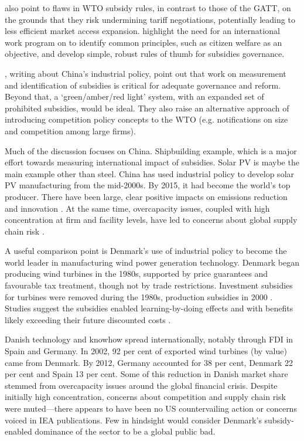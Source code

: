 \documentclass{article}
\begin{document}
\textcite{bagwell_will_2006} also point to flaws in WTO subsidy rules, in contrast to those of the GATT, on the grounds that they risk undermining tariff negotiations, potentially leading to less efficient market access expansion. \textcite{hoekman_rethinking_2020} highlight the need for an international work program on to identify common principles, such as citizen welfare as an objective, and develop simple, robust rules of thumb for subsidies governance.

\textcite{bown_wtoing_2019}, writing about China’s industrial policy, point out that work on measurement and identification of subsidies is critical for adequate governance and reform. Beyond that, a ‘green/amber/red light’ system, with an expanded set of prohibited subsidies, would be ideal. They also raise an alternative approach of introducing competition policy concepts to the WTO (e.g. notifications on size and competition among large firms).

Much of the discussion focuses on China. Shipbuilding example, which is a major effort towards measuring international impact of subsidies. Solar PV is maybe the main example other than steel. China has used industrial policy to develop solar PV manufacturing from the mid-2000s. By 2015, it had become the world’s top producer. There have been large, clear positive impacts on emissions reduction and innovation \parencite{xu_impact_2022}. At the same time, overcapacity issues, coupled with high concentration at firm and facility levels, have led to concerns about global supply chain risk \parencite{wang_why_2014, iea_global_2024}.

A useful comparison point is Denmark's use of industrial policy to become the world leader in manufacturing wind power generation technology. Denmark began producing wind turbines in the 1980s, supported by price guarantees and favourable tax treatment, though not by trade restrictions. Investment subsidies for turbines were removed during the 1980s, production subsidies in 2000 \parencite{de_la_porte_success_2022}. Studies suggest the subsidies enabled learning-by-doing effects and with benefits likely exceeding their future discounted costs \parencite{hansen_establishment_2003}.

Danish technology and knowhow spread internationally, notably through FDI in Spain and Germany. In 2002, 92 per cent of exported wind turbines (by value) came from Denmark. By 2012, Germany accounted for 38 per cent, Denmark 22 per cent and Spain 13 per cent. Some of this reduction in Danish market share stemmed from overcapacity issues around the global financial crisis. Despite initially high concentration, concerns about competition and supply chain risk were muted---there appears to have been no US countervailing action or concerns voiced in IEA publications. Few in hindsight would consider Denmark's subsidy-enabled dominance of the sector to be a global public bad.
\end{document}
